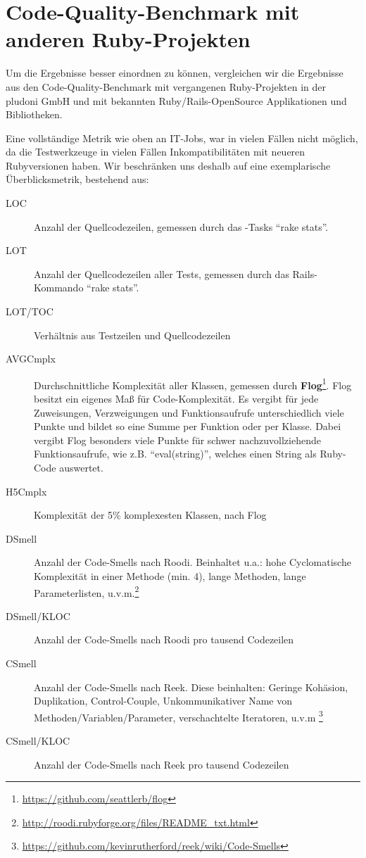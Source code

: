 

\section{Code-Quality-Benchmark mit anderen Ruby-Projekten}

Um die Ergebnisse besser einordnen zu können, vergleichen wir die Ergebnisse aus den Code-Quality-Benchmark mit vergangenen Ruby-Projekten in der pludoni GmbH und mit bekannten Ruby/Rails-OpenSource Applikationen und Bibliotheken.

Eine vollständige Metrik wie oben an IT-Jobs, war in vielen Fällen nicht möglich, da die Testwerkzeuge in vielen Fällen Inkompatibilitäten mit neueren Rubyversionen haben. Wir beschränken uns deshalb auf eine exemplarische Überblicksmetrik, bestehend aus:

\begin{description}
 \item[LOC] Anzahl der Quellcodezeilen, gemessen durch das -Tasks "`rake stats"'.
 \item[LOT] Anzahl der Quellcodezeilen aller Tests, gemessen durch das Rails-Kommando "`rake stats"'.
 \item[LOT/TOC] Verhältnis aus Testzeilen und Quellcodezeilen
 \item[AVGCmplx] Durchschnittliche Komplexität aller Klassen, gemessen durch \textbf{Flog}\footnote{\url{https://github.com/seattlerb/flog}}. Flog besitzt ein eigenes Maß für Code-Komplexität. Es vergibt für jede Zuweisungen, Verzweigungen und Funktionsaufrufe unterschiedlich viele Punkte und bildet so eine Summe per Funktion oder per Klasse. Dabei vergibt Flog besonders viele Punkte für schwer nachzuvollziehende Funktionsaufrufe, wie z.B. "`eval(string)"', welches einen String als Ruby-Code auswertet.
 \item[H5Cmplx] Komplexität der 5\% komplexesten Klassen, nach Flog
 \item[DSmell] Anzahl der Code-Smells nach Roodi. Beinhaltet u.a.: hohe Cyclomatische Komplexität in einer Methode (min. 4), lange Methoden, lange Parameterlisten, u.v.m.\footnote{\url{http://roodi.rubyforge.org/files/README_txt.html}}
 \item[DSmell/KLOC] Anzahl der Code-Smells nach Roodi pro tausend Codezeilen
 \item[CSmell] Anzahl der Code-Smells nach Reek. Diese beinhalten: Geringe Kohäsion, Duplikation, Control-Couple, Unkommunikativer Name von Methoden/Variablen/Parameter, verschachtelte Iteratoren, u.v.m  \footnote{\url{https://github.com/kevinrutherford/reek/wiki/Code-Smells}}
 \item[CSmell/KLOC] Anzahl der Code-Smells nach Reek pro tausend Codezeilen
\end{description}







